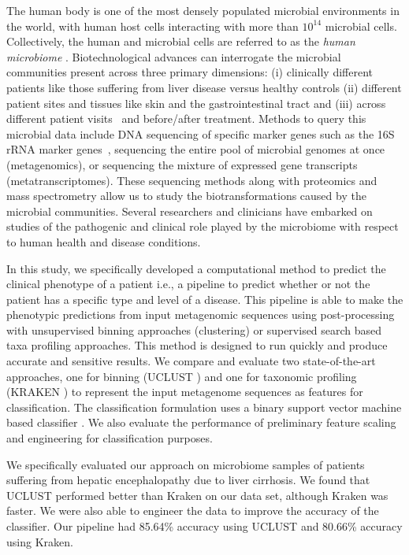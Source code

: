 
The human body is one of the 
most densely populated microbial 
environments in the world, with human host cells interacting 
with  more than $10^{14}$ microbial cells. Collectively, the human 
and microbial cells are referred to as the 
\emph{human microbiome} \cite{turnbaugh_human_2007,backhed_host-bacterial_2005}. 
%
%
%
Biotechnological  advances 
can 
interrogate the microbial 
communities present across three primary dimensions: (i) clinically different
patients like those suffering from liver disease versus healthy controls (ii) different
patient sites and tissues like skin and the gastrointestinal tract 
and (iii) across different patient visits~\cite{Costello12182009,Qin:2010fk} and before/after treatment. 
%
Methods to query this  microbial
data include DNA sequencing of 
specific marker genes such as the 16S rRNA marker genes~\cite{Woese97}, 
sequencing
the entire pool of microbial genomes at once (metagenomics), or 
sequencing the mixture of 
expressed gene transcripts (metatranscriptomes).
%
These sequencing methods along 
with proteomics and mass spectrometry
allow us to study the
biotransformations caused by the microbial communities. 
%
Several researchers and clinicians have embarked on
studies of the pathogenic and clinical 
role played by the microbiome with respect to
human health and disease conditions.


In this study, we specifically developed
a computational method to predict the clinical phenotype
of a patient i.e., a pipeline to 
predict whether or not the patient has a specific type and level of  a disease.  This 
pipeline
is able to make the phenotypic
predictions from input metagenomic sequences using post-processing 
with unsupervised binning approaches (clustering) or  supervised search based 
taxa profiling approaches.  This method is designed to 
run quickly and produce accurate and sensitive 
results. We  compare and evaluate two state-of-the-art 
approaches, one for binning (UCLUST \cite{Edgar10}) and one for taxonomic profiling (KRAKEN \cite{Wood14}) 
to represent the input metagenome sequences as features for classification. The classification
formulation uses a binary support vector machine based classifier \cite{vap95}. We also 
evaluate the performance of preliminary 
feature scaling and engineering  for classification purposes. 

We specifically evaluated our approach on 
microbiome samples of patients suffering from hepatic encephalopathy due 
to liver cirrhosis. 
%
We found that 
UCLUST performed better than Kraken on our data 
set, although Kraken was faster. We were also able to 
engineer the data to improve the accuracy of the classifier. Our 
pipeline had 85.64\% accuracy using UCLUST and 80.66\% accuracy 
using Kraken. 

%

